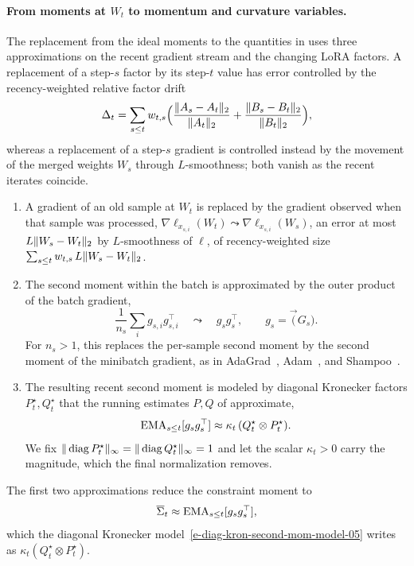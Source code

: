 \paragraph{From moments at $W_t$ to momentum and curvature variables.}
The replacement from the ideal moments to the quantities in
 uses three approximations on the recent gradient stream and
the changing LoRA factors. A replacement of a step-$s$ factor by its step-$t$
value has error controlled by the recency-weighted relative factor drift
\[
  \Delta_t=\sum_{s\le t}w_{t,s}\Big(\frac{\| A_s-A_t\|_2}{\| A_t\|_2}
  +\frac{\| B_s-B_t\|_2}{\| B_t\|_2}\Big),
\]
whereas a replacement of a step-$s$ gradient is controlled instead by the
movement of the merged weights $W_s$ through $L$-smoothness; both vanish as the
recent iterates coincide.
\begin{enumerate}[leftmargin=1.6em,itemsep=2pt,topsep=2pt]
  \item A gradient of an old sample at $W_t$ is replaced by the gradient
  observed when that sample was processed,
  $\nabla\ell_{x_{s,i}}(W_t)\leadsto\nabla\ell_{x_{s,i}}(W_s)$, an error at most
  $L\| W_s-W_t\|_2$ by $L$-smoothness of $\ell$, of recency-weighted size
  $\sum_{s\le t}w_{t,s}\,L\| W_s-W_t\|_2$.
  \item The second moment within the batch is approximated by the outer
  product of the batch gradient,
  \[
    \frac1{n_s}\sum_i g_{s,i}g_{s,i}^\top
    \quad\leadsto\quad
    g_sg_s^\top,
    \qquad g_s=\vec(G_s).
  \]
  For $n_s>1$, this replaces the per-sample second moment by the
  second moment of the minibatch gradient, as in AdaGrad~\cite{adagrad},
  Adam~\cite{adam}, and Shampoo~\cite{shampoo}.
  \item The resulting recent second moment is modeled by diagonal
  Kronecker factors $P^\star_t,Q^\star_t$ that the running estimates $P,Q$
  of  approximate,
  \begin{equation}\label{e-diag-kron-second-mom-model-05}
    \operatorname{EMA}_{s\le t}[g_sg_s^\top]\approx\kappa_t\,(Q^\star_t\otimes P^\star_t).
  \end{equation}
  We fix $\| \operatorname{diag} P^\star_t\|_\infty=\| \operatorname{diag} Q^\star_t\|_\infty=1$ and
  let the scalar $\kappa_t>0$ carry the magnitude, which the final
  normalization removes.
\end{enumerate}
The first two approximations reduce the constraint moment to
\[
  \overline\Sigma_t\approx\operatorname{EMA}_{s\le t}[g_sg_s^\top],
\]
which the diagonal Kronecker model~\eqref{e-diag-kron-second-mom-model-05}
writes as $\kappa_t(Q^\star_t\otimes P^\star_t)$.


